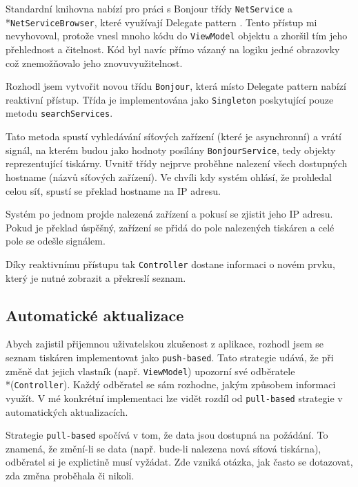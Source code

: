 Standardní knihovna nabízí pro práci s Bonjour třídy \texttt{NetService} a\\*\texttt{NetServiceBrowser}, které využívají Delegate pattern \cite{apple-netservicebrowser}.
Tento přístup mi nevyhovoval, protože vnesl mnoho kódu do \texttt{ViewModel} objektu a zhoršil tím jeho přehlednost a čitelnost.
Kód byl navíc přímo vázaný na logiku jedné obrazovky což znemožňovalo jeho znovuvyužitelnost.

Rozhodl jsem vytvořit novou třídu \texttt{Bonjour}, která místo Delegate pattern nabízí reaktivní přístup.
Třída je implementována jako \texttt{Singleton} \cite{thatthinginswift-singletons} poskytující pouze metodu \texttt{searchServices}.

Tato metoda spustí vyhledávání síťových zařízení (které je asynchronní) a vrátí signál, na kterém budou jako hodnoty posílány \texttt{BonjourService}, tedy objekty reprezentující tiskárny.
Uvnitř třídy nejprve proběhne nalezení všech dostupných hostname (názvů síťových zařízení).
Ve chvíli kdy systém ohlásí, že prohledal celou síť, spustí se překlad hostname na IP adresu.

Systém po jednom projde nalezená zařízení a pokusí se zjistit jeho IP adresu.
Pokud je překlad úspěšný, zařízení se přidá do pole nalezených tiskáren a celé pole se odešle signálem.

Díky reaktivnímu přístupu tak \texttt{Controller} dostane informaci o novém prvku, který je nutné zobrazit a překreslí seznam.

\subsection{Automatické aktualizace}

Abych zajistil přijemnou uživatelskou zkušenost z aplikace, rozhodl jsem se seznam tiskáren implementovat jako \texttt{push-based}.
Tato strategie udává, že při změně dat jejich vlastník (např. \texttt{ViewModel}) upozorní své odběratele\\*(\texttt{Controller}).
Každý odběratel se sám rozhodne, jakým způsobem informaci využít.
V mé konkrétní implementaci lze vidět rozdíl od \texttt{pull-based} strategie v automatických aktualizacích.

Strategie \texttt{pull-based} spočívá v tom, že data jsou dostupná na požádání.
To znamená, že změní-li se data (např. bude-li nalezena nová síťová tiskárna), odběratel si je explictině musí vyžádat.
Zde vzniká otázka, jak často se dotazovat, zda změna proběhala či nikoli.

